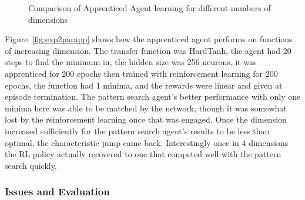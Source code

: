 \begin{figure}
\centering

\caption{Comparison of Apprenticed Agent learning for different numbers of dimensions}
\label{fig:exp2dimapp}
\end{figure}
Figure~\ref{fig:exp2parapp} shows how the apprenticed agent performs on functions of increasing dimension. The transfer function was HardTanh, the agent had 20 steps to find the minimum in, the hidden size was 256 neurons, it was apprenticed for 200 epochs then trained with reinforcement learning for 200 epochs, the function had 1 minima, and the rewards were linear and given at episode termination. The pattern search agent's better performance with only one minima here was able to be matched by the network, though it was somewhat lost by the reinforcement learning once that was engaged. Once the dimension increased sufficiently for the pattern search agent's results to be less than optimal, the characteristic jump came back. Interestingly once in 4 dimensions the RL policy actually recovered to one that competed well with the pattern search quickly.

\subsubsection{Issues and Evaluation}

